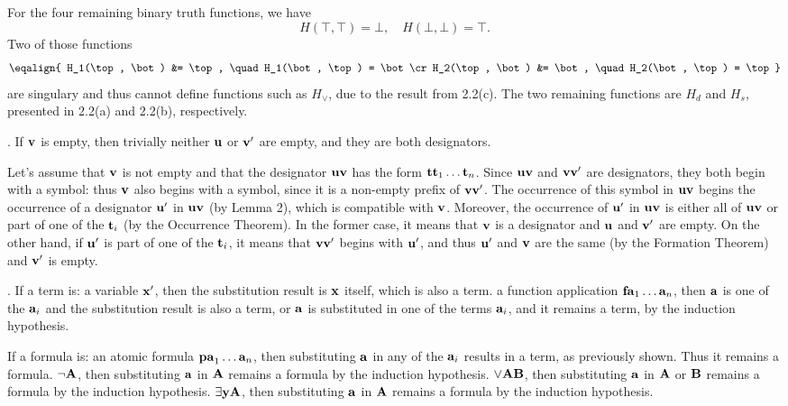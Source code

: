 \itemitem{-} For the four remaining binary truth functions, we have
$$
H(\top, \top) = \bot, \quad H(\bot, \bot) = \top.
$$
Two of those functions
$$\eqalign{
H_1(\top, \bot) &= \top, \quad H_1(\bot, \top) = \bot\cr
H_2(\top, \bot) &= \bot, \quad H_2(\bot, \top) = \top}
$$
are singulary and thus cannot define functions such as $H_{\lor}$, 
due to the result from 2.2(c). The two remaining functions are 
$H_d$ and $H_s$, presented in 2.2(a) and 2.2(b), respectively.
\medskip

. If ${\bf v}$ is empty, then trivially neither ${\bf u}$ or ${\bf v}'$ are empty, 
and they are both designators.

Let's assume that ${\bf v}$ is not empty and that the designator ${\bf u}{\bf v}$ has the form
${\bf t t}_1 \dots {\bf t}_n$. Since ${\bf u}{\bf v}$ and ${\bf v}{\bf v}'$ are 
designators, they both begin with a symbol: thus ${\bf v}$ also begins with a symbol, since it
is a non-empty prefix of ${\bf v}{\bf v}'$. The occurrence of this symbol in ${\bf u}{\bf v}$ 
begins the occurrence of a designator ${\bf u}'$ in ${\bf u}{\bf v}$ (by Lemma 2), which is 
compatible with ${\bf v}$. Moreover, the occurrence of ${\bf u}'$ in ${\bf u}{\bf v}$ is either 
all of ${\bf u}{\bf v}$ or part of one of the ${\bf t}_i$ (by the Occurrence Theorem). In the 
former case, it means that ${\bf v}$ is a designator and ${\bf u}$ and ${\bf v}'$ are 
empty. On the other hand, if ${\bf u}'$ is part of one of the ${\bf t}_i$, it means that
${\bf v}{\bf v}'$ begins with ${\bf u}'$, and thus ${\bf u}'$ and ${\bf v}$ are the same
(by the Formation Theorem) and ${\bf v}'$ is empty.
\medskip

. If a term is:
 a variable ${\bf x}'$, then the substitution result is ${\bf x}$ itself, which 
is also a term.
 a function application ${\bf fa}_1 \dots {\bf a}_n$, then ${\bf a}$ is one of 
the ${\bf a}_i$ and the substitution result is also a term, or ${\bf a}$ is substituted
in one of the terms ${\bf a}_i$, and it remains a term, by the induction hypothesis.

If a formula is:
 an atomic formula ${\bf pa}_1 \dots {\bf a}_n$, then substituting ${\bf a}$ in
any of the ${\bf a}_i$ results in a term, as previously shown. Thus it remains a formula.
 $\neg {\bf A}$, then substituting ${\bf a}$ in ${\bf A}$ remains a formula by the
induction hypothesis.
 $\lor{\bf A}{\bf B}$, then substituting ${\bf a}$ in ${\bf A}$ or ${\bf B}$ remains a 
formula by the induction hypothesis.
 $\exists{\bf y}{\bf A}$, then substituting ${\bf a}$ in ${\bf A}$ remains a formula 
by the induction hypothesis.
\medskip

